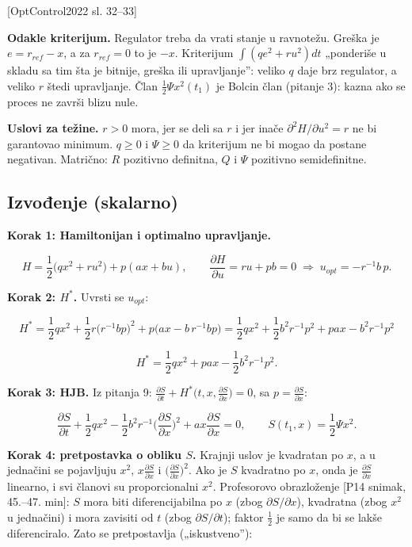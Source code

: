 \documentclass[11pt,a4paper,parskip=half,headsepline,numbers=noenddot]{scrartcl}
\DeclareRobustCommand{\izvor}[1]{{\small\color{izvorC}[#1]}}
\begin{document}
\izvor{OptControl2022 sl. 32--33}

\textbf{Odakle kriterijum.} Regulator treba da vrati stanje u ravnotežu. Greška je \(e = r_{ref} - x\), a za \(r_{ref} = 0\) to je \(-x\). Kriterijum \(\int(qe^2 + ru^2)dt\) „ponderiše u skladu sa tim šta je bitnije, greška ili upravljanje'': veliko \(q\) daje brz regulator, a veliko \(r\) štedi upravljanje. Član \(\frac12\Psi x^2(t_1)\) je Bolcin član (pitanje 3): kazna ako se proces ne završi blizu nule.

\textbf{Uslovi za težine.} \(r > 0\) mora, jer se deli sa \(r\) i jer inače \(\partial^2H/\partial u^2 = r\) ne bi garantovao minimum. \(q \ge 0\) i \(\Psi \ge 0\) da kriterijum ne bi mogao da postane negativan. Matrično: \(R\) pozitivno definitna, \(Q\) i \(\Psi\) pozitivno semidefinitne.

\subsection{Izvođenje (skalarno)}

\textbf{Korak 1: Hamiltonijan i optimalno upravljanje.}

\[H = \frac12\big(qx^2 + ru^2\big) + p(ax + bu), \qquad \frac{\partial H}{\partial u} = ru + pb = 0 \;\Rightarrow\; u_{opt} = -r^{-1}b\,p .\]

\textbf{Korak 2: \(H^*\).} Uvrsti se \(u_{opt}\):

\[H^* = \frac12qx^2 + \frac12r\big(r^{-1}bp\big)^2 + p\big(ax - b\,r^{-1}bp\big) = \frac12qx^2 + \frac12b^2r^{-1}p^2 + pax - b^2r^{-1}p^2\]

\[H^* = \frac12qx^2 + pax - \frac12b^2r^{-1}p^2 .\]

\textbf{Korak 3: HJB.} Iz pitanja 9: \(\frac{\partial S}{\partial t} + H^*\big(t, x, \frac{\partial S}{\partial x}\big) = 0\), sa \(p = \frac{\partial S}{\partial x}\):

\[\frac{\partial S}{\partial t} + \frac12qx^2 - \frac12b^2r^{-1}\Big(\frac{\partial S}{\partial x}\Big)^2 + ax\frac{\partial S}{\partial x} = 0, \qquad S(t_1, x) = \frac12\Psi x^2 .\]

\textbf{Korak 4: pretpostavka o obliku \(S\).} Krajnji uslov je kvadratan po \(x\), a u jednačini se pojavljuju \(x^2\), \(x\frac{\partial S}{\partial x}\) i \(\big(\frac{\partial S}{\partial x}\big)^2\). Ako je \(S\) kvadratno po \(x\), onda je \(\frac{\partial S}{\partial x}\) linearno, i svi članovi su proporcionalni \(x^2\). Profesorovo obrazloženje \izvor{P14 snimak, 45.--47. min}: \(S\) mora biti diferencijabilna po \(x\) (zbog \(\partial S/\partial x\)), kvadratna (zbog \(x^2\) u jednačini) i mora zavisiti od \(t\) (zbog \(\partial S/\partial t\)); faktor \(\frac12\) je samo da bi se lakše diferenciralo. Zato se pretpostavlja („iskustveno''):
\end{document}
